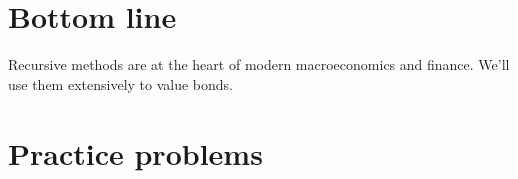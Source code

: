 \documentclass[11pt]{article}
\begin{document}
\begin{enumerate}
\begin{comment}
\item {\bf Utility.\/}
In dynamic settings, we often use the additive utility function,
\begin{eqnarray*}
    U(z_t) &=& E_t \sum_{j=0}^\infty \beta^j u[c(z_{t+j})] ,
\end{eqnarray*}
for some function $u$ and discount factor $ 0 < \beta < 1 $.
The familiar power utility consists of $u(c) = c^{1-\alpha}/(1-\alpha)$ with $\alpha > 0$.
Here $U_t$ means ``utility from date $t$ on.''
We can rewrite it as
\begin{eqnarray*}
    U(z_t) &=&  u[c(z_{t})] + \beta E_t [U(z_{t+1})]  .
\end{eqnarray*}
Why does this work?  Because $U(z_{t+1})$ takes care of the rest of the terms.

As in our other examples, we can envision building this up term by term,
\begin{eqnarray*}
    U^{n+1}(z_t) &=&  u[c(z_{t})] + \beta E_t [U^n(z_{t+1})] ,
\end{eqnarray*}
starting with $U^0(z_t) = 0$.
If all goes well,
the unknown function $U(z_t)$ is the limit of the $U^n(z_t)$'s.
\end{comment}

\end{enumerate}


\section{Bottom line}

Recursive methods are at the heart of modern macroeconomics and finance.
We'll use them extensively to value bonds.


\section*{Practice problems}
\end{document}
